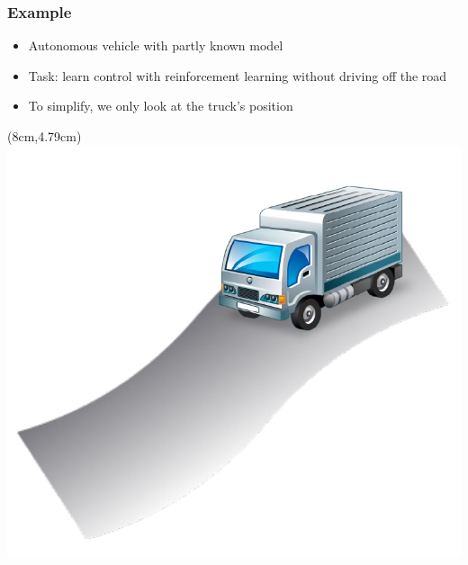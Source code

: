 \documentclass[t]{beamer}
\begin{document}
\begin{frame}
\frametitle{Example}
\begin{itemize}
\item Autonomous vehicle with \linebreak partly known model
\item Task: learn control with reinforcement learning without driving off the road
\item To simplify, we only look at the truck's position
\end{itemize}
\begin{textblock*}{5cm}(8cm,4.79cm) %
\includegraphics[width=0.29\paperwidth]{TruckOnStreet}
\end{textblock*}
\end{frame}
\end{document}
